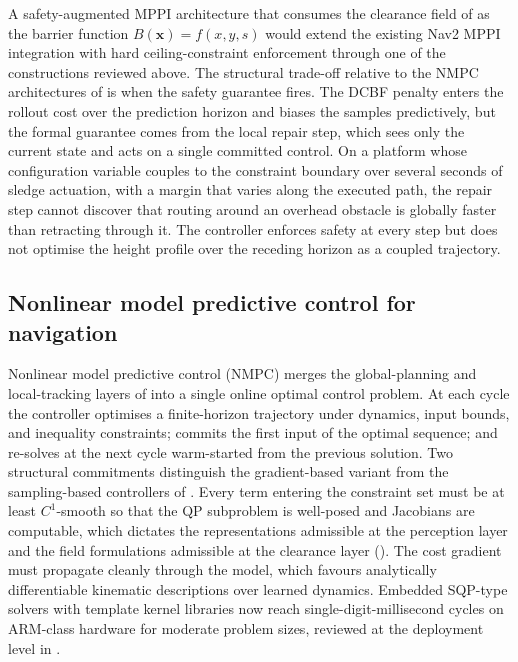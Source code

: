 \documentclass[11pt,a4paper]{article}
\begin{document}
A safety-augmented MPPI architecture that consumes the clearance field of  as the barrier function $B(\mathbf{x}) = f(x, y, s)$ would extend the existing Nav2 MPPI integration with hard ceiling-constraint enforcement through one of the constructions reviewed above. The structural trade-off relative to the NMPC architectures of  is when the safety guarantee fires. The DCBF penalty enters the rollout cost over the prediction horizon and biases the samples predictively, but the formal guarantee comes from the local repair step, which sees only the current state and acts on a single committed control. On a platform whose configuration variable couples to the constraint boundary over several seconds of sledge actuation, with a margin that varies along the executed path, the repair step cannot discover that routing around an overhead obstacle is globally faster than retracting through it. The controller enforces safety at every step but does not optimise the height profile over the receding horizon as a coupled trajectory.

\subsection{Nonlinear model predictive control for navigation}
\label{sec:sq4:nmpc}

Nonlinear model predictive control (NMPC) merges the global-planning and local-tracking layers of  into a single online optimal control problem. At each cycle the controller optimises a finite-horizon trajectory under dynamics, input bounds, and inequality constraints; commits the first input of the optimal sequence; and re-solves at the next cycle warm-started from the previous solution. Two structural commitments distinguish the gradient-based variant from the sampling-based controllers of . Every term entering the constraint set must be at least $C^1$-smooth so that the QP subproblem is well-posed and Jacobians are computable, which dictates the representations admissible at the perception layer and the field formulations admissible at the clearance layer (). The cost gradient must propagate cleanly through the model, which favours analytically differentiable kinematic descriptions over learned dynamics. Embedded SQP-type solvers with template kernel libraries now reach single-digit-millisecond cycles on ARM-class hardware for moderate problem sizes, reviewed at the deployment level in .
\end{document}
